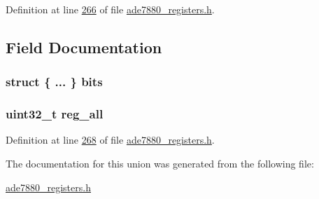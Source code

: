 Definition at line \hyperlink{a00036_source_l00266}{266} of file \hyperlink{a00036_source}{ade7880\-\_\-registers.\-h}.



\subsection{Field Documentation}
\hypertarget{a00033_acc8266b43bfb109c59e6515ee4d6a716}{
\subsubsection[{bits}]{\setlength{\rightskip}{0pt plus 5cm}struct \{ ... \}  bits}}\label{d0/dc0/a00033_acc8266b43bfb109c59e6515ee4d6a716}
\hypertarget{a00033_ae44a0232a79ff51b5ef7aa80e4b35470}{
\subsubsection[{reg\-\_\-all}]{\setlength{\rightskip}{0pt plus 5cm}uint32\-\_\-t reg\-\_\-all}}\label{d0/dc0/a00033_ae44a0232a79ff51b5ef7aa80e4b35470}


Definition at line \hyperlink{a00036_source_l00268}{268} of file \hyperlink{a00036_source}{ade7880\-\_\-registers.\-h}.



The documentation for this union was generated from the following file\-:\begin{DoxyCompactItemize}
\item 
\hyperlink{a00036}{ade7880\-\_\-registers.\-h}\end{DoxyCompactItemize}
